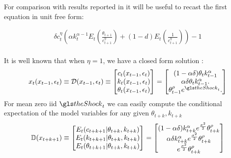 \documentclass[12pt]{article}
\begin{document}
For comparison with results reported in \citep{Judd2014} it will be useful
to recast the first equation in unit free form:

\begin{gather*}
\delta c_t^{\eta}\left ( \alpha k_{t}^{\alpha-1} E_t \left (\frac{\theta_{t+1}}{c_{t+1}^\eta} \right )+ (1-d)E_t\left (\frac{1}{c_{t+1}^\eta} \right ) \right ) -1\\
\end{gather*}

It is well known that when $\eta=1$, we have a closed form solution \citep{lettau03}:
\begin{gather}
x_t(\xtmEpsArg)\equiv    \DR(\xtmEpsArg)\equiv
   \begin{bmatrix}
     c_t(\xtmEpsArg)\\k_t(\xtmEpsArg)\\ \theta_t(\xtmEpsArg)
   \end{bmatrix}=
   \begin{bmatrix}
(1-\alpha \delta) \theta_{t} k_{t-1}^\alpha\\
  \alpha \delta \theta_{t} k_{t-1}^\alpha.\label{soln}\\
\theta_{t-1}^\rho e^{\theShock_t}.
   \end{bmatrix}
\end{gather}
For mean zero iid $\theShock_t$ we can easily 
compute the conditional expectation of the model variables for any given $\theta_{t+k},k_{t+k}$
\begin{gather*}
  \mathbb{D}(x_{t+k+1})\equiv
  \begin{bmatrix}
  E_t(c_{t+k+1}|\theta_{t+k},k_{t+k})\\
  E_t(k_{t+k+1}|\theta_{t+k},k_{t+k})\\
  E_t(\theta_{t+k+1}|\theta_{t+k},k_{t+k})
  \end{bmatrix}=
  \begin{bmatrix}
(1-\alpha\delta)k_{t+k}^\alpha e^{\frac{\sigma^2}{2}}\theta_{t+k}^\rho\\
\alpha\delta k_{t+k}^\alpha e^{\frac{\sigma^2}{2}}\theta_{t+k}^\rho\\
e^{\frac{\sigma^2}{2}}\theta_{t+k}^\rho
  \end{bmatrix}
\end{gather*}
\end{document}
